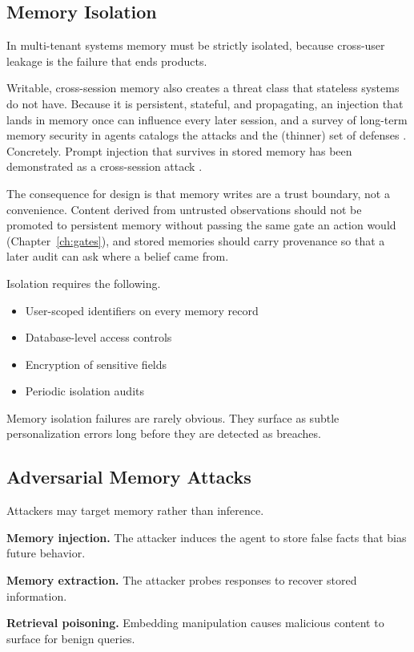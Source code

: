 \subsection{Memory Isolation}

In multi-tenant systems memory must be strictly isolated, because cross-user
leakage is the failure that ends products.

Writable, cross-session memory also creates a threat class that stateless systems
do not have. Because it is persistent, stateful, and propagating, an injection
that lands in memory once can influence every later session, and a survey of
long-term memory security in agents catalogs the attacks and the (thinner) set of
defenses \cite{memsec2026}. Concretely. Prompt injection that survives in stored
memory has been demonstrated as a cross-session attack \cite{crosssession2026}.

The consequence for design is that memory writes are a trust boundary, not a
convenience. Content derived from untrusted observations should not be promoted to
persistent memory without passing the same gate an action would
(Chapter~\ref{ch:gates}), and stored memories should carry provenance so that a
later audit can ask where a belief came from.

Isolation requires the following.
\begin{itemize}
\item User-scoped identifiers on every memory record
\item Database-level access controls
\item Encryption of sensitive fields
\item Periodic isolation audits
\end{itemize}

Memory isolation failures are rarely obvious. They surface as subtle personalization errors long before they are detected as breaches.

\subsection{Adversarial Memory Attacks}

Attackers may target memory rather than inference.

\textbf{Memory injection.}
The attacker induces the agent to store false facts that bias future behavior.

\textbf{Memory extraction.}
The attacker probes responses to recover stored information.

\textbf{Retrieval poisoning.}
Embedding manipulation causes malicious content to surface for benign queries.

